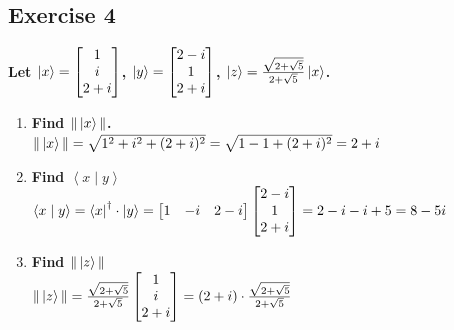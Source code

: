 \documentclass[12pt]{article}
\theoremstyle{plain}
\theoremstyle{nonumberplain}
\theoremstyle{plain}
\theoremstyle{nonumberplain}
\newcommand\1{{\bf 1}}
\newcommand{\bmat}[1]{\begin{bmatrix*} #1 \end{bmatrix*}} %
\newcommand{\<}{\left\langle}
\renewcommand{\>}{\right\rangle}
\newcommand{\inp}[2]{\left\langle#1\mid #2\right\rangle} %
\begin{document}
\subsection{Exercise 4}
\textbf{Let $\ket{x}=\bmat{1 \\ i \\ 2+i}$, $\ket{y}=\bmat{2-i \\ 1 \\ 2+i}$, $\ket{z}=\frac{\sqrt{2+\sqrt{5}}}{2+\sqrt{5}}\ket{x}$.}
\begin{enumerate}
	\item \textbf{Find $\Vert\ket{x}\Vert$.} \\
	$\Vert\ket{x}\Vert=\sqrt{1^2+i^2+(2+i)^2}=\sqrt{1-1+(2+i)^2}=2+i$
	\item \textbf{Find $\inp{x}{y}$} \\
	$\inp{x}{y}=\bra{x}^\dagger\cdot\ket{y}=\bmat{1 & -i & 2-i}\bmat{2-i \\ 1 \\ 2+i}=2-i-i+5=8-5i$
	\item \textbf{Find $\Vert\ket{z}\Vert$} \\ $\Vert\ket{z}\Vert=\frac{\sqrt{2+\sqrt{5}}}{2+\sqrt{5}}			\bmat{1 \\ i \\ 2+i}=(2+i)\cdot\frac{\sqrt{2+\sqrt{5}}}{2+\sqrt{5}}$
\end{enumerate}

\end{document}
